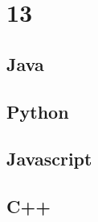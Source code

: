 \documentclass[11pt, oneside]{article}
\begin{document}
\section*{13}

\subsection*{Java}

\subsection*{Python}

\subsection*{Javascript}

\subsection*{C++}

\end{document}
